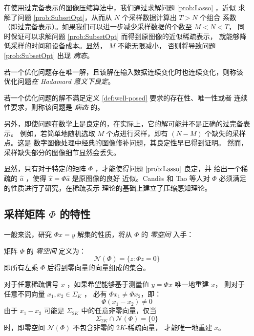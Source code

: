 在使用过完备表示的图像压缩算法中，我们通过求解问题 \ref{prob:Lasso} ，近似
求解了问题 \ref{prob:SubsetOpt}，从而从 $N$ 个采样数据计算出 $T > N$ 个组合
系数 （即过完备表示）。如果我们可以进一步减少采样数据的个数至 $M < N < T$，
同时保证可以求解问题 \ref{prob:SubsetOpt} 而得到原图像的近似稀疏表示，
就能够降低采样的时间和设备成本。显然， $M$ 不能无限减小，
否则将导致问题 \ref{prob:SubsetOpt} 出现 \emph{病态}。
\begin{definition}[良定问题] \label{def:well-posed}
若一个优化问题存在唯一解，且该解在输入数据连续变化时也连续变化，则称该
优化问题\emph{在 Hadamard 意义下良定}。
\end{definition}
\begin{definition}[病态问题] \label{def:ill-posed}
若一个优化问题的解不满足定义 \ref{def:well-posed} 要求的存在性、唯一性或者
连续性要求，则称该问题是 \emph{病态} 的。 \cite{MathProblemImage}
\end{definition}

另外，即使问题在数学上是良定的，在实际上，它的解可能并不是正确的过完备表示。
例如，若简单地随机选取 $M$ 个点进行采样，即有 $(N-M)$ 个缺失的采样点。这是
数字图像处理中经典的图像修补问题，其良定性早已得到证明。\cite{unknown}
 然而，采样缺失部分的图像细节显然会丢失。

显然，只有对于特定的矩阵 $\Phi$ ，才能使得问题 $\ref{prob:Lasso}$ 良定，并
给出一个稀疏的 $\hat{a}$ ，使得 $\hat{x} = \Phi \hat{a}$ 是原图像的良好
近似。Cand\`es 和 Tao 等人对 $\Phi$ 必须满足的性质进行了研究，在稀疏表示
理论的基础上建立了压缩感知理论。

\subsection{采样矩阵 $\Phi$ 的特性}

一般来说，研究 $\Phi x = y$ 解集的性质，将从 $\Phi$ 的 \emph{零空间} 入手：
\begin{definition}[零空间]
矩阵 $\Phi$ 的 \emph{零空间} 定义为：
\begin{equation}
\mathcal{N}(\Phi) = \{z:\Phi z = 0\}
\end{equation}
即所有左乘 $\Phi$ 后得到零向量的向量组成的集合。
\end{definition}

对于任意稀疏信号 $x$ ，如果希望能够基于测量值 $y = \Phi x$ 唯一地重建 $x$，
则对于任意不同向量 $x_1, x_2 \in \Sigma_K$ ，
必有 $\Phi x_1 \neq \Phi x_2$，即：
\begin{equation}
\Phi (x_1 - x_2) \neq 0
\end{equation}
由于 $x_1 - x_2$ 可能是 $\Sigma_{2K}$ 中的任意非零向量，仅当
\begin{equation}
\Sigma_{2K} \cap \mathcal{N}(\Phi) = \{0\}
\end{equation}
时，即零空间 $\mathcal{N}(\Phi)$ 不包含非零的 $2K$-稀疏向量，
才能唯一地重建 $x$。

